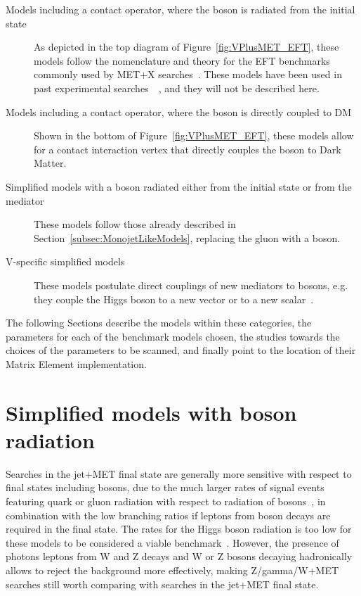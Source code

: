 \begin{description}
 \item[Models including a contact operator, where the boson is radiated from the initial state] As depicted in
 the top diagram of Figure~\ref{fig:VPlusMET_EFT}, these models follow the nomenclature and theory
 for the EFT benchmarks commonly used by MET+X searches~\cite{Goodman:2010ku}. These models
 have been used in past experimental searches~~\cite{Khachatryan:2014rwa, Aad:2014vka,Khachatryan:2014tva, Aad:2014vka,
 ATLAS:2014wra, Aad:2013oja}, and they will not be described here.
 \item[Models including a contact operator, where the boson is directly coupled to DM]
 Shown in the bottom of Figure~\ref{fig:VPlusMET_EFT},
 these models allow for a contact interaction vertex that directly couples the boson to Dark Matter.
 \item[Simplified models with a boson radiated either from the initial state or from the mediator] These models follow those
 already described in Section~\ref{subsec:MonojetLikeModels}, replacing the gluon with a boson.
 \item[V-specific simplified models] These models postulate direct couplings of new mediators
 to bosons, e.g. they couple the Higgs boson to a new vector or to a new scalar~\cite{Carpenter:2013xra,Berlin:2014cfa}. 
\end{description}

The following Sections describe the models within these categories,
the parameters for each of the benchmark models chosen,
the studies towards the choices of the parameters to be scanned,
and finally point to the location of their Matrix Element
implementation.

\section{Simplified models with boson radiation}

Searches in the jet+MET final state are generally more sensitive
with respect to final states including bosons, due to the much
larger rates of signal events featuring quark or gluon radiation with
respect to radiation of bosons~\cite{Zhou:2013fla},
in combination with the low branching ratios if leptons from
boson decays are required in the final state.
The rates for the Higgs boson radiation is too low for these models
to be considered a viable benchmark~\cite{Carpenter:2013xra}.
However, the presence of photons
leptons from W and Z decays
and W or Z bosons decaying hadronically
allows to reject the background more effectively, making Z/gamma/W+MET searches
still worth comparing with searches in the jet+MET final state.

